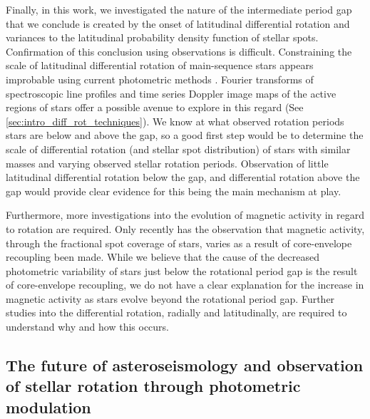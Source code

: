 Finally, in this work, we investigated the nature of the intermediate period gap that we conclude is created by the onset of latitudinal differential rotation and variances to the latitudinal probability density function of stellar spots.
Confirmation of this conclusion using observations is difficult.
Constraining the scale of latitudinal differential rotation of main-sequence stars appears improbable using current photometric methods \citep[See Section 4.3 of]{aigrain_testing_2015}.
Fourier transforms of spectroscopic line profiles and time series Doppler image maps of the active regions of stars offer a possible avenue to explore in this regard (See \ref{sec:intro_diff_rot_techniques}).
We know at what observed rotation periods stars are below and above the gap, so a good first step would be to determine the scale of differential rotation (and stellar spot distribution) of stars with similar masses and varying observed stellar rotation periods.
Observation of little latitudinal differential rotation below the gap, and differential rotation above the gap would provide clear evidence for this being the main mechanism at play.

Furthermore, more investigations into the evolution of magnetic activity in regard to rotation are required.
Only recently has the observation that magnetic activity, through the fractional spot coverage of stars, varies as a result of core-envelope recoupling been made.
While we believe that the cause of the decreased photometric variability of stars just below the rotational period gap is the result of core-envelope recoupling, we do not have a clear explanation for the increase in magnetic activity as stars evolve beyond the rotational period gap.
Further studies into the differential rotation, radially and latitudinally, are required to understand why and how this occurs.

\subsection{The future of asteroseismology and observation of stellar rotation through photometric modulation}

